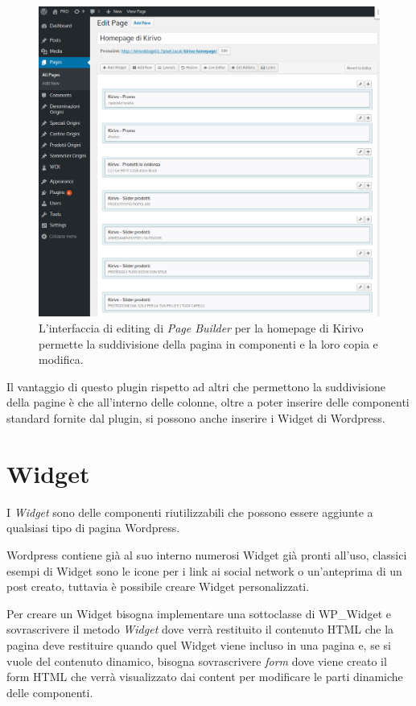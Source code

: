 \begin{figure}
  \includegraphics[width=\textwidth]{figure/pagebuilder.png}
  \caption{L'interfaccia di editing di \emph{Page Builder} per la homepage di Kirivo permette
  la suddivisione della pagina in componenti e la loro copia e modifica.}
  \label{fig:wsource}
\end{figure}


Il vantaggio di questo plugin rispetto ad altri che permettono la suddivisione della pagine è che all'interno delle colonne,
oltre a poter inserire delle componenti standard fornite dal plugin, si possono anche inserire i Widget di Wordpress.

\section{Widget}
I \emph{Widget} sono delle componenti riutilizzabili che possono essere aggiunte a qualsiasi
tipo di pagina Wordpress. 

Wordpress contiene già al suo interno numerosi Widget già pronti all'uso, classici esempi di Widget sono le icone per i link ai social network o un'anteprima di un post creato, tuttavia è possibile creare Widget
personalizzati.

Per creare un Widget bisogna implementare una sottoclasse di WP\_Widget\cite{WPWID}
e sovrascrivere il metodo \emph{Widget} dove verrà restituito il contenuto HTML che la pagina deve restituire quando quel Widget viene incluso in una pagina
e, se si vuole del contenuto dinamico, bisogna sovrascrivere \emph{form} dove viene creato il form HTML che verrà visualizzato dai content per modificare le
parti dinamiche delle componenti.

